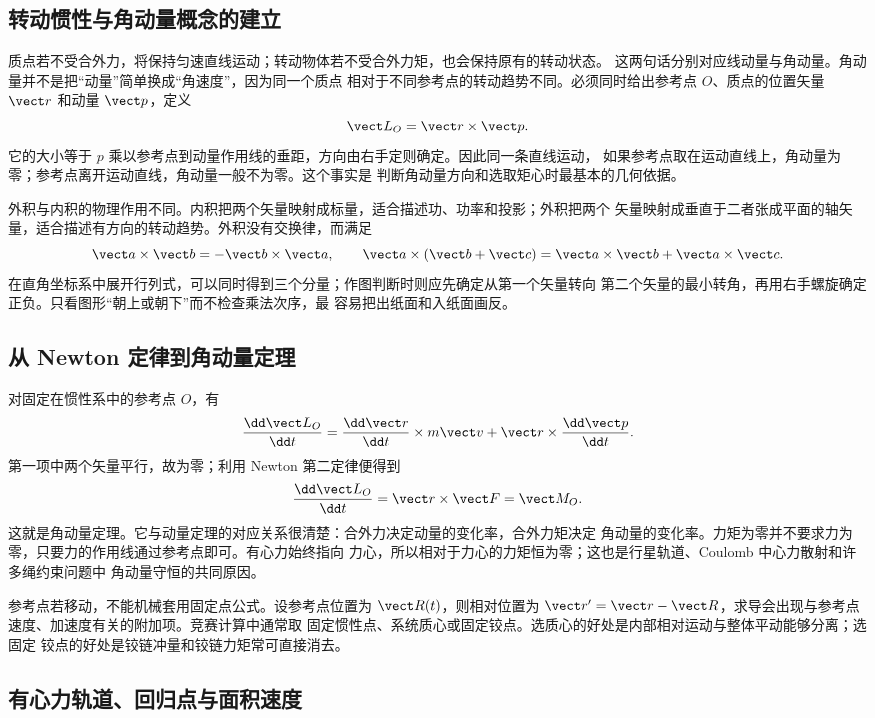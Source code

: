 \subsection*{转动惯性与角动量概念的建立}

质点若不受合外力，将保持匀速直线运动；转动物体若不受合外力矩，也会保持原有的转动状态。
这两句话分别对应线动量与角动量。角动量并不是把“动量”简单换成“角速度”，因为同一个质点
相对于不同参考点的转动趋势不同。必须同时给出参考点 $O$、质点的位置矢量 $\vect r$ 和动量
$\vect p$，定义
\[
  \vect L_O=\vect r\times\vect p.
\]
它的大小等于 $p$ 乘以参考点到动量作用线的垂距，方向由右手定则确定。因此同一条直线运动，
如果参考点取在运动直线上，角动量为零；参考点离开运动直线，角动量一般不为零。这个事实是
判断角动量方向和选取矩心时最基本的几何依据。

外积与内积的物理作用不同。内积把两个矢量映射成标量，适合描述功、功率和投影；外积把两个
矢量映射成垂直于二者张成平面的轴矢量，适合描述有方向的转动趋势。外积没有交换律，而满足
\[
  \vect a\times\vect b=-\vect b\times\vect a,
  \qquad
  \vect a\times(\vect b+\vect c)=
  \vect a\times\vect b+\vect a\times\vect c.
\]
在直角坐标系中展开行列式，可以同时得到三个分量；作图判断时则应先确定从第一个矢量转向
第二个矢量的最小转角，再用右手螺旋确定正负。只看图形“朝上或朝下”而不检查乘法次序，最
容易把出纸面和入纸面画反。

\subsection*{从 Newton 定律到角动量定理}

对固定在惯性系中的参考点 $O$，有
\[
  \frac{\dd\vect L_O}{\dd t}
  =\frac{\dd\vect r}{\dd t}\times m\vect v
   +\vect r\times\frac{\dd\vect p}{\dd t}.
\]
第一项中两个矢量平行，故为零；利用 Newton 第二定律便得到
\[
  \frac{\dd\vect L_O}{\dd t}=\vect r\times\vect F=\vect M_O.
\]
这就是角动量定理。它与动量定理的对应关系很清楚：合外力决定动量的变化率，合外力矩决定
角动量的变化率。力矩为零并不要求力为零，只要力的作用线通过参考点即可。有心力始终指向
力心，所以相对于力心的力矩恒为零；这也是行星轨道、Coulomb 中心力散射和许多绳约束问题中
角动量守恒的共同原因。

参考点若移动，不能机械套用固定点公式。设参考点位置为 $\vect R(t)$，则相对位置为
$\vect r'=\vect r-\vect R$，求导会出现与参考点速度、加速度有关的附加项。竞赛计算中通常取
固定惯性点、系统质心或固定铰点。选质心的好处是内部相对运动与整体平动能够分离；选固定
铰点的好处是铰链冲量和铰链力矩常可直接消去。

\subsection*{有心力轨道、回归点与面积速度}

